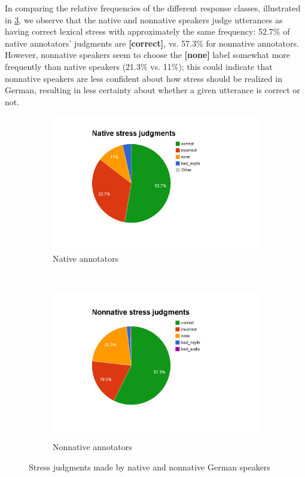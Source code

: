 		

		In comparing the relative frequencies of the different response classes, illustrated in \cref{fig:l1pies}, we observe that the native and nonnative speakers judge utterances as having correct lexical stress with approximately the same frequency: 52.7\% of native annotators' judgments are \textbf{[correct]}, vs. 57.3\% for nonnative annotators. However, nonnative speakers seem to choose the \textbf{[none]}
		label somewhat more frequently than native speakers (21.3\% vs. 11\%); this could indicate that nonnative speakers are less confident about how stress should be realized in German, resulting in less certainty about whether a given utterance is correct or not. 
		
		
			\begin{figure}[htb]
				\centering
				\begin{subfigure}[b]{.5\textwidth}
					\centering
					\includegraphics[width=\textwidth]{img/annotation/nativePie}
					\caption{Native annotators}
					\label{fig:l1pies:native}
				\end{subfigure}%
				~
				\begin{subfigure}[b]{.5\textwidth}
					\centering
					\includegraphics[width=\textwidth]{img/annotation/nonnativePie}
					\caption{Nonnative annotators}
					\label{fig:l1pies:nonnative}
				\end{subfigure}%
				\caption{Stress judgments made by native and nonnative German speakers}
				\label{fig:l1pies}
			\end{figure}
